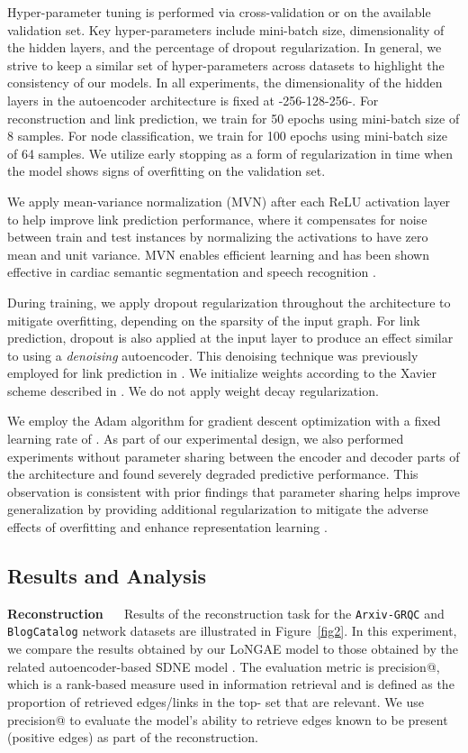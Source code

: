 \documentclass[letterpaper, conference]{IEEEtran}
\begin{document}
Hyper-parameter tuning is performed via cross-validation or on the available validation set. Key hyper-parameters include mini-batch size, dimensionality of the hidden layers, and the percentage of dropout regularization. In general, we strive to keep a similar set of hyper-parameters across datasets to highlight the consistency of our models. In all experiments, the dimensionality of the hidden layers in the autoencoder architecture is fixed at -256-128-256-. For reconstruction and link prediction, we train for 50 epochs using mini-batch size of 8 samples. For node classification, we train for 100 epochs using mini-batch size of 64 samples. We utilize early stopping as a form of regularization in time when the model shows signs of overfitting on the validation set.

We apply mean-variance normalization (MVN) after each ReLU activation layer to help improve link prediction performance, where it compensates for noise between train and test instances by normalizing the activations to have zero mean and unit variance. MVN enables efficient learning and has been shown effective in cardiac semantic segmentation \cite{Tran:2016} and speech recognition \cite{Joshi:2016}.

During training, we apply dropout regularization \cite{Srivastava:2014} throughout the architecture to mitigate overfitting, depending on the sparsity of the input graph. For link prediction, dropout is also applied at the input layer to produce an effect similar to using a \emph{denoising} autoencoder. This denoising technique was previously employed for link prediction in \cite{Chen:2014}. We initialize weights according to the Xavier scheme described in \cite{Xavier:2010}. We do not apply weight decay regularization.

We employ the Adam algorithm \cite{Kingma:2015} for gradient descent optimization with a fixed learning rate of . As part of our experimental design, we also performed experiments without parameter sharing between the encoder and decoder parts of the architecture and found severely degraded predictive performance. This observation is consistent with prior findings that parameter sharing helps improve generalization by providing additional regularization to mitigate the adverse effects of overfitting and enhance representation learning \cite{Vukotic:2016,Yang:2017}.
\subsection{Results and Analysis}
\noindent \textbf{Reconstruction} ~~ Results of the reconstruction task for the \texttt{Arxiv-GRQC} and \texttt{BlogCatalog} network datasets are illustrated in Figure~\ref{fig2}. In this experiment, we compare the results obtained by our LoNGAE model to those obtained by the related autoencoder-based SDNE model \cite{Wang:2016}. The evaluation metric is precision@, which is a rank-based measure used in information retrieval and is defined as the proportion of retrieved edges/links in the top- set that are relevant. We use precision@ to evaluate the model's ability to retrieve edges known to be present (positive edges) as part of the reconstruction.
\end{document}
